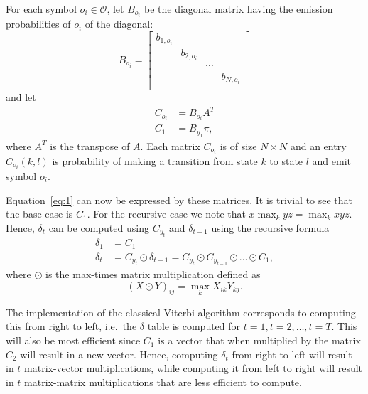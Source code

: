 For each symbol $o_i \in \mathcal{O}$, let $B_{o_i}$ be the diagonal matrix
having the emission probabilities of $o_i$ of the diagonal:
\begin{equation*}
  B_{o_i} =
  \begin{bmatrix}
    b_{1, o_i} &            &        &            \\
               & b_{2, o_i} &        &            \\
               &            & \cdots &            \\
               &            &        & b_{N, o_i} \\
  \end{bmatrix}
\end{equation*}
and let
\begin{align*}
  C_{o_i}      & = B_{o_i} A^T                    \\
  C_1          & = B_{y_1} \pi,
\end{align*}
where $A^T$ is the transpose of $A$. Each matrix $C_{o_i}$ is of size $N \times
N$ and an entry $C_{o_i}(k, l)$ is probability of making a transition
from state $k$ to state $l$ and emit symbol $o_i$.

Equation~\eqref{eq:1} can now be expressed by these matrices. It is trivial to
see that the base case is $C_1$. For the recursive case we note that
$x \max_k y z = \max_k x y z$. Hence, $\delta_t$ can be computed using $C_{y_t}$
and $\delta_{t - 1}$ using the recursive formula
\begin{equation}
  \label{eq:2}
  \begin{aligned}
    \delta_1 &= C_1 \\
    \delta_t &= C_{y_t} \odot \delta_{t - 1} = C_{y_t} \odot C_{y_{t-1}} \odot \dots \odot C_1,
  \end{aligned}
\end{equation}
where $\odot$ is the max-times matrix multiplication defined as
\begin{equation*}
{(X \odot Y)}_{ij} = \max_k X_{ik} Y_{kj}.
\end{equation*}

The implementation of the classical Viterbi algorithm corresponds to
computing this from right to left, i.e.\ the $\delta$ table is computed for $t
= 1, t=2, \dots, t=T$. This will also be most efficient since
$C_1$ is a vector that when multiplied by the matrix $C_2$ will result in a new
vector. Hence, computing $\delta_t$ from right to left will result in $t$
matrix-vector multiplications, while computing it from left to right will
result in $t$ matrix-matrix multiplications that are less efficient to compute.

